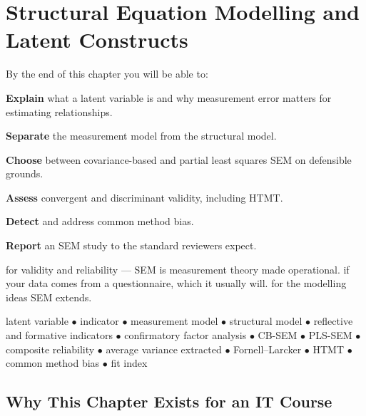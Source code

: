 \chapter{Structural Equation Modelling and Latent Constructs}\label{ch:sem}

\begin{outcomes}
By the end of this chapter you will be able to:
\begin{tight}
  \item \textbf{Explain} what a latent variable is and why measurement error
    matters for estimating relationships.
  \item \textbf{Separate} the measurement model from the structural model.
  \item \textbf{Choose} between covariance-based and partial least squares SEM
    on defensible grounds.
  \item \textbf{Assess} convergent and discriminant validity, including HTMT.
  \item \textbf{Detect} and address common method bias.
  \item \textbf{Report} an SEM study to the standard reviewers expect.
\end{tight}
\end{outcomes}

\begin{prereq}
 for validity and reliability --- SEM is measurement theory
made operational.  if your data comes from a questionnaire, which
it usually will.  for the modelling ideas SEM extends.
\end{prereq}

\begin{keyterms}
latent variable $\bullet$ indicator $\bullet$ measurement model $\bullet$
structural model $\bullet$ reflective and formative indicators $\bullet$
confirmatory factor analysis $\bullet$ CB-SEM $\bullet$ PLS-SEM $\bullet$
composite reliability $\bullet$ average variance extracted $\bullet$
Fornell--Larcker $\bullet$ HTMT $\bullet$ common method bias $\bullet$ fit index
\end{keyterms}

\section{Why This Chapter Exists for an IT Course}

